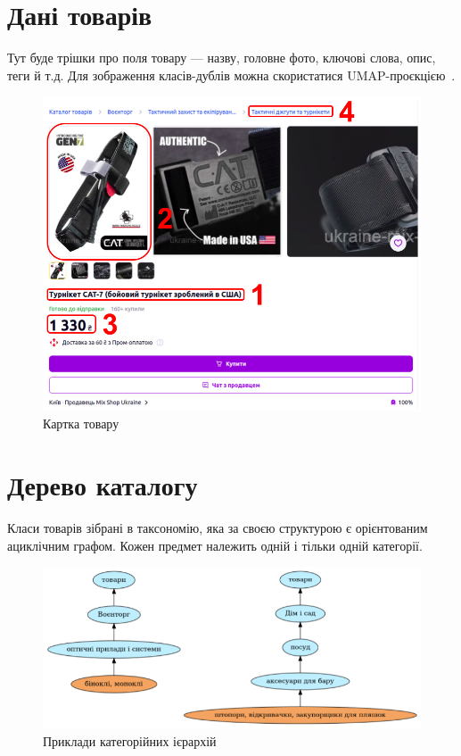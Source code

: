 \documentclass[fleqn,12pt,a4paper]{report}
\numberwithin{equation}{chapter}
\numberwithin{figure}{chapter}
\numberwithin{table}{chapter}
\numberwithin{footnote}{chapter}
\numberwithin{figure}{section}
\begin{document}
    \newpage


    \section{Дані товарів}\label{sec:section1.2}

    Тут буде трішки про поля товару --- назву, головне фото, ключові слова, опис, теги й т.д.
    Для зображення класів-дублів можна скористатися UMAP-проєкцією~\cite{mcinnes2018umap-software}.

    \noindent
    \begin{figure}[ht]
        \includegraphics[width=\textwidth]{images/catify-product}
        \caption{Картка товару}
    \end{figure}

    \newpage


    \section{Дерево каталогу}\label{sec:section1.3}

    Класи товарів зібрані в таксономію, яка за своєю структурою є орієнтованим ациклічним графом.
    Кожен предмет належить одній і тільки одній категорії.

    \noindent
    \begin{figure}[ht]
        \includegraphics[width=\textwidth]{images/catify-hierarchies}
        \caption{Приклади категорійних ієрархій}
    \end{figure}
\end{document}
